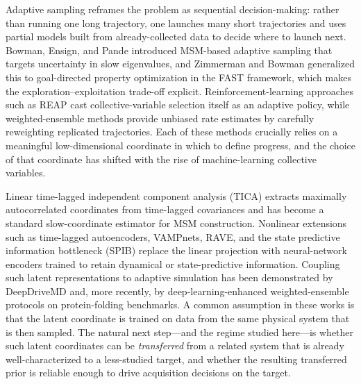 \documentclass[journal=jctcce,manuscript=article,layout=twocolumn]{achemso}
\begin{document}
Adaptive sampling reframes the problem as sequential decision-making: rather than running one long trajectory, one launches many short trajectories and uses partial models built from already-collected data to decide where to launch next.
Bowman, Ensign, and Pande introduced MSM-based adaptive sampling that targets uncertainty in slow eigenvalues,\cite{bowman2010adaptive} and Zimmerman and Bowman generalized this to goal-directed property optimization in the FAST framework, which makes the exploration--exploitation trade-off explicit.\cite{zimmerman2015fast}
Reinforcement-learning approaches such as REAP cast collective-variable selection itself as an adaptive policy,\cite{shamsi2018reap,kleiman2022multiagent} while weighted-ensemble methods provide unbiased rate estimates by carefully reweighting replicated trajectories.\cite{huber1996we,zuckerman2017weighted,yang2024werl}
Each of these methods crucially relies on a meaningful low-dimensional coordinate in which to define progress, and the choice of that coordinate has shifted with the rise of machine-learning collective variables.

Linear time-lagged independent component analysis (TICA) extracts maximally autocorrelated coordinates from time-lagged covariances and has become a standard slow-coordinate estimator for MSM construction.\cite{perezhernandez2013tica,schwantes2013improvements,scherer2015pyemma,noe2017collective}
Nonlinear extensions such as time-lagged autoencoders, VAMPnets, RAVE, and the state predictive information bottleneck (SPIB) replace the linear projection with neural-network encoders trained to retain dynamical or state-predictive information.\cite{wehmeyer2018time,mardt2018vampnets,ribeiro2018rave,wang2021spib,tishby2000information}
Coupling such latent representations to adaptive simulation has been demonstrated by DeepDriveMD\cite{lee2019deepdrivemd} and, more recently, by deep-learning-enhanced weighted-ensemble protocols on protein-folding benchmarks.\cite{leung2025dlwe}
A common assumption in these works is that the latent coordinate is trained on data from the same physical system that is then sampled.
The natural next step---and the regime studied here---is whether such latent coordinates can be \emph{transferred} from a related system that is already well-characterized to a less-studied target, and whether the resulting transferred prior is reliable enough to drive acquisition decisions on the target.
\end{document}
